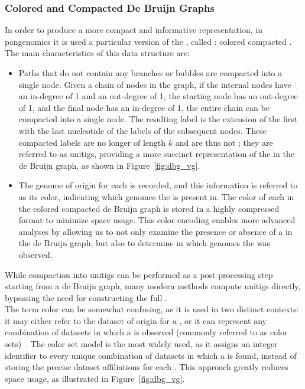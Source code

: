 \subsubsection{Colored and Compacted De Bruijn Graphs}
\label{sec:ccdbg}
In order to produce a more compact and informative representation, in pangenomics it is used a particular version of the \dbg, called \ccdbg: colored compacted \dbg. The main characteristics of this data structure are:
\begin{itemize}
	\item Paths that do not contain any branches or bubbles are compacted into a single node. Given a chain of nodes in the graph, if the internal nodes have an in-degree of 1 and an out-degree of 1, the starting node has an out-degree of 1, and the final node has an in-degree of 1, the entire chain can be compacted into a single node. The resulting label is the extension of the first \kmer with the last nucleotide of the labels of the subsequent nodes. These compacted labels are no longer of length $k$ and are thus not \kmers; they are referred to as unitigs, providing a more succinct representation of the \kmers in the de Bruijn graph, as shown in Figure~\ref{fig:dbg_vg}.
	\item The genome of origin for each \kmer is recorded, and this information is referred to as its color, indicating which genomes the \kmer is present in. The color of each \kmer in the colored compacted de Bruijn graph is stored in a highly compressed format to minimize space usage. This color encoding enables more advanced analyses by allowing us to not only examine the presence or absence of a \kmer in the de Bruijn graph, but also to determine in which genomes the \kmer was observed.
\end{itemize}
While \kmer compaction into unitigs can be performed as a post-processing step starting from a de Bruijn graph, many modern methods compute unitigs directly, bypassing the need for constructing the full \dbg.\\
The term color can be somewhat confusing, as it is used in two distinct contexts: it may either refer to the dataset of origin for a \kmer, or it can represent any combination of datasets in which a \kmer is observed (commonly referred to as color sets)~\cite{marchet_kmersets}. The color set model is the most widely used, as it assigns an integer identifier to every unique combination of datasets in which a \kmer is found, instead of storing the precise dataset affiliations for each \kmer. This approach greatly reduces space usage, as illustrated in Figure~\ref{fig:dbg_vg}. 

